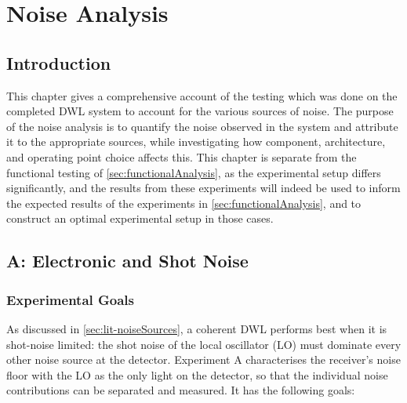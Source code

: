 \chapter{Noise Analysis}
\label{sec:noiseAnalysis}

 \section{Introduction}
 This chapter gives a comprehensive account of the testing which was done on the completed DWL system to account for the various sources of noise. The purpose of the noise analysis is to quantify the noise observed in the system and attribute it to the appropriate sources, while investigating how component, architecture, and operating point choice affects this. This chapter is separate from the functional testing of \autoref{sec:functionalAnalysis}, as the experimental setup differs significantly, and the results from these experiments will indeed be used to inform the expected results of the experiments in \autoref{sec:functionalAnalysis}, and to construct an optimal experimental setup in those cases.

 \section{A: Electronic and Shot Noise}
 
 \subsection{Experimental Goals}
 As discussed in \autoref{sec:lit-noiseSources}, a coherent DWL performs best when it is
 shot-noise limited: the shot noise of the local oscillator (LO) must dominate every other
 noise source at the detector. Experiment A characterises the receiver's noise floor with
 the LO as the only light on the detector, so that the individual noise contributions can be
 separated and measured. It has the following goals:
 
